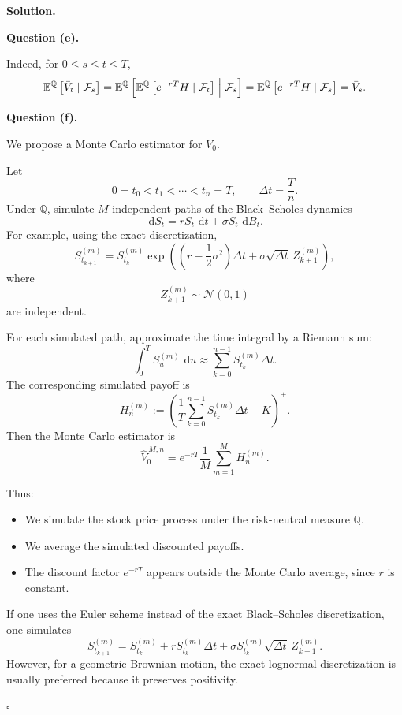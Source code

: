\documentclass[11pt]{article}
\theoremstyle{plain}
\newcommand{\E}{\mathbb{E}}
\newcommand{\dd}{\,\mathrm{d}}
\newcommand{\F}{\mathcal{F}}
\newcommand{\1}{\mathbf{1}}
\theoremstyle{definition}
\newenvironment{solution}
{\par\medskip\noindent\textbf{Solution.}\par\medskip}
{\hfill$\square$\par\medskip}
\newenvironment{solutionpart}[1]
{\par\medskip\noindent\textbf{#1.}\par\smallskip}
{\par\medskip}
\begin{document}
\begin{solution}
\begin{solutionpart}{Question (e)}
Indeed, for $0\le s\le t\le T$,
\[
\E^\mathbb{Q}\left[\bar V_t\mid \F_s\right]
=
\E^\mathbb{Q}\left[
\E^\mathbb{Q}\left[
e^{-rT}H
\mid \F_t
\right]
\Bigm|\F_s
\right]
=
\E^\mathbb{Q}\left[
e^{-rT}H
\mid \F_s
\right]
=
\bar V_s.
\]
\end{solutionpart}

\begin{solutionpart}{Question (f)}
We propose a Monte Carlo estimator for $V_0$.

Let
\[
0=t_0<t_1<\cdots<t_n=T,
\qquad
\Delta t=\frac{T}{n}.
\]
Under $\mathbb{Q}$, simulate $M$ independent paths of the Black--Scholes dynamics
\[
\dd S_t=rS_t\,\dd t+\sigma S_t\,\dd B_t.
\]
For example, using the exact discretization,
\[
S_{t_{k+1}}^{(m)}
=
S_{t_k}^{(m)}
\exp\left(
\left(r-\frac12\sigma^2\right)\Delta t
+
\sigma\sqrt{\Delta t}\,Z_{k+1}^{(m)}
\right),
\]
where
\[
Z_{k+1}^{(m)}\sim \mathcal{N}(0,1)
\]
are independent.

For each simulated path, approximate the time integral by a Riemann sum:
\[
\int_0^T S_u^{(m)}\,\dd u
\approx
\sum_{k=0}^{n-1} S_{t_k}^{(m)}\Delta t.
\]
The corresponding simulated payoff is
\[
H^{(m)}_n
:=
\left(
\frac1T
\sum_{k=0}^{n-1} S_{t_k}^{(m)}\Delta t
-K
\right)^+.
\]
Then the Monte Carlo estimator is
\[
\boxed{
\widehat V_0^{\,M,n}
=
e^{-rT}
\frac1M\sum_{m=1}^M H_n^{(m)}.
}
\]

Thus:
\begin{itemize}[leftmargin=1.4em]
\item We simulate the stock price process under the risk-neutral measure $\mathbb{Q}$.
\item We average the simulated discounted payoffs.
\item The discount factor $e^{-rT}$ appears outside the Monte Carlo average, since $r$ is constant.
\end{itemize}

If one uses the Euler scheme instead of the exact Black--Scholes discretization, one simulates
\[
S_{t_{k+1}}^{(m)}
=
S_{t_k}^{(m)}
+
rS_{t_k}^{(m)}\Delta t
+
\sigma S_{t_k}^{(m)}\sqrt{\Delta t}\,Z_{k+1}^{(m)}.
\]
However, for a geometric Brownian motion, the exact lognormal discretization is usually preferred because it preserves positivity.
\end{solutionpart}


\end{solution}
\end{document}
